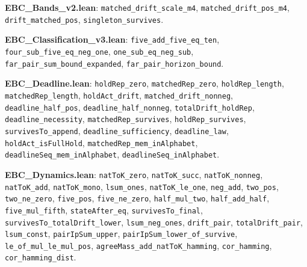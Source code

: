 \footnotesize
\textbf{EBC\_Bands\_v2.lean}: \texttt{matched\_\allowbreak{}drift\_\allowbreak{}scale\_\allowbreak{}m4}, \texttt{matched\_\allowbreak{}drift\_\allowbreak{}pos\_\allowbreak{}m4}, \texttt{drift\_\allowbreak{}matched\_\allowbreak{}pos}, \texttt{singleton\_\allowbreak{}survives}.

\textbf{EBC\_Classification\_v3.lean}: \texttt{five\_\allowbreak{}add\_\allowbreak{}five\_\allowbreak{}eq\_\allowbreak{}ten}, \texttt{four\_\allowbreak{}sub\_\allowbreak{}five\_\allowbreak{}eq\_\allowbreak{}neg\_\allowbreak{}one}, \texttt{one\_\allowbreak{}sub\_\allowbreak{}eq\_\allowbreak{}neg\_\allowbreak{}sub}, \texttt{far\_\allowbreak{}pair\_\allowbreak{}sum\_\allowbreak{}bound\_\allowbreak{}expanded}, \texttt{far\_\allowbreak{}pair\_\allowbreak{}horizon\_\allowbreak{}bound}.

\textbf{EBC\_Deadline.lean}: \texttt{holdRep\_\allowbreak{}zero}, \texttt{matchedRep\_\allowbreak{}zero}, \texttt{holdRep\_\allowbreak{}length}, \texttt{matchedRep\_\allowbreak{}length}, \texttt{holdAct\_\allowbreak{}drift}, \texttt{matched\_\allowbreak{}drift\_\allowbreak{}nonneg}, \texttt{deadline\_\allowbreak{}half\_\allowbreak{}pos}, \texttt{deadline\_\allowbreak{}half\_\allowbreak{}nonneg}, \texttt{totalDrift\_\allowbreak{}holdRep}, \texttt{deadline\_\allowbreak{}necessity}, \texttt{matchedRep\_\allowbreak{}survives}, \texttt{holdRep\_\allowbreak{}survives}, \texttt{survivesTo\_\allowbreak{}append}, \texttt{deadline\_\allowbreak{}sufficiency}, \texttt{deadline\_\allowbreak{}law}, \texttt{holdAct\_\allowbreak{}isFullHold}, \texttt{matchedRep\_\allowbreak{}mem\_\allowbreak{}inAlphabet}, \texttt{deadlineSeq\_\allowbreak{}mem\_\allowbreak{}inAlphabet}, \texttt{deadlineSeq\_\allowbreak{}inAlphabet}.

\textbf{EBC\_Dynamics.lean}: \texttt{natToK\_\allowbreak{}zero}, \texttt{natToK\_\allowbreak{}succ}, \texttt{natToK\_\allowbreak{}nonneg}, \texttt{natToK\_\allowbreak{}add}, \texttt{natToK\_\allowbreak{}mono}, \texttt{lsum\_\allowbreak{}ones}, \texttt{natToK\_\allowbreak{}le\_\allowbreak{}one}, \texttt{neg\_\allowbreak{}add}, \texttt{two\_\allowbreak{}pos}, \texttt{two\_\allowbreak{}ne\_\allowbreak{}zero}, \texttt{five\_\allowbreak{}pos}, \texttt{five\_\allowbreak{}ne\_\allowbreak{}zero}, \texttt{half\_\allowbreak{}mul\_\allowbreak{}two}, \texttt{half\_\allowbreak{}add\_\allowbreak{}half}, \texttt{five\_\allowbreak{}mul\_\allowbreak{}fifth}, \texttt{stateAfter\_\allowbreak{}eq}, \texttt{survivesTo\_\allowbreak{}final}, \texttt{survivesTo\_\allowbreak{}totalDrift\_\allowbreak{}lower}, \texttt{lsum\_\allowbreak{}neg\_\allowbreak{}ones}, \texttt{drift\_\allowbreak{}pair}, \texttt{totalDrift\_\allowbreak{}pair}, \texttt{lsum\_\allowbreak{}const}, \texttt{pairIpSum\_\allowbreak{}upper}, \texttt{pairIpSum\_\allowbreak{}lower\_\allowbreak{}of\_\allowbreak{}survive}, \texttt{le\_\allowbreak{}of\_\allowbreak{}mul\_\allowbreak{}le\_\allowbreak{}mul\_\allowbreak{}pos}, \texttt{agreeMass\_\allowbreak{}add\_\allowbreak{}natToK\_\allowbreak{}hamming}, \texttt{cor\_\allowbreak{}hamming}, \texttt{cor\_\allowbreak{}hamming\_\allowbreak{}dist}.

